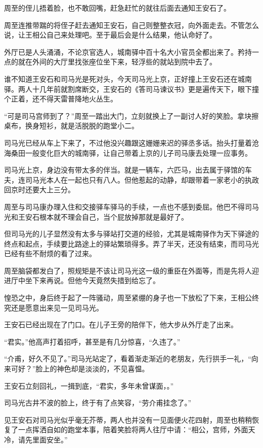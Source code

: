 周至的侄儿捂着脸，也不敢回嘴，赶急赶忙的就往后面去通知王安石了。

周至连推带踹的将侄子赶去通知王安石，自己则整整衣冠，向外面走去。不管怎么说，让王相公自己来处理吧。至于最后会是什么结果，他认命好了。

外厅已是人头涌涌，不论京官选人，城南驿中百十名大小官员全都出来了。矜持一点的就在外间的大厅里找张座位坐下来，轻浮些的就站到院中去了。

谁不知道王安石和司马光是死对头，今天司马光上京，正好撞上王安石还在城南驿。两人十几年前就割席断交，王安石的《答司马谏议书》更是遍传天下，眼下撞个正着，还不得天雷普降地火丛生。

“可是司马宫师到了？”周至一踏出大门，立刻就换上了一副讨人好的笑脸。拿块擦桌布，换身短衫，就是活脱脱的跑堂小二。

司马光已经从车上下来了，不过他没兴趣跟这姗姗来迟的驿丞多话。抬头打量着沧海桑田一般变化巨大的城南驿，让自己带着上京的儿子司马康去处理一应事务。

司马光上京，身边没有带太多的伴当。就是一辆车，六匹马，出去属于驿馆的车夫，连司马光本人在一起也只有八人。但他惹起的动静，却跟带着一家老小的执政回京时还要大上三分。

周至与司马康办理入住和交接驿车驿马的手续，一点也不感到委屈。他巴不得司马光和王安石根本就不理会自己，当个屁放掉那就是最好了。

但司马光的儿子显然没有太多与驿站打交道的经验，尤其是城南驿作为天下驿途的终点和起点，手续要比路途上的驿站繁琐得多。弄了半天，还没有结束，而司马光已经有些不耐烦的看了过来。

周至脑袋都发白了，照规矩是不该让司马光这一级的重臣在外面等，而是先将人迎进厅中坐下来再说。但他今天竟然失措到给忘了。

惶恐之中，身后终于起了一阵骚动，周至紧绷的身子也一下放松了下来，王相公终究还是愿意出来见一见司马光。

王安石已经出现在了门口。在儿子王旁的陪伴下，他大步从外厅走了出来。

“君实。”他高声打着招呼，甚至是有几分惊喜，“久违了。”

“介甫，好久不见了。”司马光站定了，看着渐走渐近的老朋友，先行拱手一礼，“向来可好？”脸上的神色却是淡淡的，不见喜愠。

王安石立刻回礼，一揖到底，“君实，多年未曾谋面，。”

司马光古井不波的脸上，终于有了点笑容，“劳介甫挂念了。”

见王安石对司马光似乎毫无芥蒂，两人也并没有一见面便火花四射，周至也稍稍恢复了一点挥洒自如的跑堂本事，陪着笑脸将两人往厅中请：“相公，宫师，外面天冷，请先里面安坐。”

